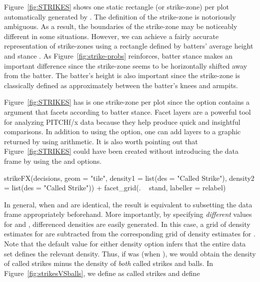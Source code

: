 \begin{article}
Figure~\ref{fig:STRIKES} shows one static rectangle (or strike-zone)
per plot automatically generated by . The definition
of the strike-zone is notoriously ambiguous. As a result, the boundaries
of the strike-zone may be noticeably different in some situations.
However, we can achieve a fairly accurate representation of strike-zones
using a rectangle defined by batters' average height and stance \citep{Strikezones}.
As Figure~\ref{fig:strike-probs} reinforces, batter stance makes
an important difference since the strike-zone seems to be horizontally
shifted away from the batter. The batter's height is also important
since the strike-zone is classically defined as approximately between
the batter's knees and armpits.

Figure~\ref{fig:STRIKES} has is one strike-zone per plot since the
 option contains a  argument that facets
according to batter stance. Facet layers are a powerful tool for analyzing
PITCHf/x data because they help produce quick and insightful comparisons.
In addition to using the  option, one can add layers
to a graphic returned by  using  arithmetic.
It is also worth pointing out that Figure~\ref{fig:STRIKES} could
have been created without introducing the  data frame
by using the  and  options. 
%
\begin{Schunk}
\begin{Sinput}
strikeFX(decisions, geom = "tile", density1 = list(des = "Called Strike"),          
  density2 = list(des = "Called Strike")) + facet_grid(. ~ stand, labeller = relabel)
\end{Sinput}
\end{Schunk}
%
In general, when  and  are identical,
the result is equivalent to subsetting the data frame appropriately
beforehand. More importantly, by specifying \emph{different} values
for  and , differenced densities are
easily generated. In this case, a grid of density estimates for 
are subtracted from the corresponding grid of density estimates for
. Note that the default  value for either
density option infers that the entire data set defines the relevant
density. Thus, if  was  (when ),
we would obtain the density of called strikes minus the density of
\emph{both} called strikes and balls. In Figure~\ref{fig:strikesVSballs},
we define  as called strikes and define 

\end{article}
